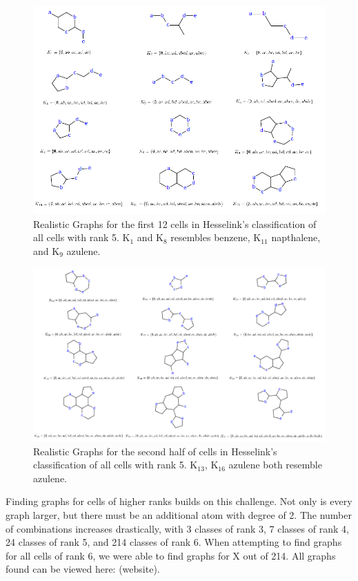 \documentclass[12pt]{article}
\begin{document}
\begin{figure}[ht!]
\centering
\includegraphics[width=160mm]{rank5Results1.png}
\caption{Realistic Graphs for the first 12 cells in Hesselink's classification of all cells with rank 5. K$_1$ and K$_8$ resembles benzene, K$_{11}$ napthalene, and K$_9$ azulene.}
\label{fig:rank5Results1}
\end{figure}

\begin{figure}[ht!]
\centering
\includegraphics[width=160mm]{rank5Results2.png}
\caption{Realistic Graphs for the second half of cells in Hesselink's classification of all cells with rank 5. K$_{13}$, K$_{16}$ azulene both resemble azulene.}
\label{fig:rank5Results2}
\end{figure}

Finding graphs for cells of higher ranks builds on this challenge. Not only is every graph larger, but there must be an additional atom with degree of 2. The number of combinations increases drastically, with 3 classes of rank 3, 7 classes of rank 4, 24 classes of rank 5, and 214 classes of rank 6. When attempting to find graphs for all cells of rank 6, we were able to find graphs for X out of 214. All graphs found can be viewed here: (website).
\end{document}
